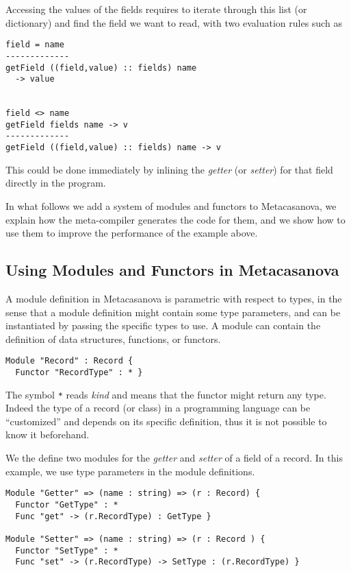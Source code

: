 Accessing the values of the fields requires to iterate through this list (or dictionary) and find the field we want to read, with two evaluation rules such as

\begin{lstlisting}
field = name
-------------
getField ((field,value) :: fields) name 
  -> value


field <> name
getField fields name -> v
-------------
getField ((field,value) :: fields) name -> v
\end{lstlisting}

\noindent
This could be done immediately by inlining the \textit{getter} (or \textit{setter}) for that field directly in the program.

In what follows we add a system of modules and functors to Metacasanova, we explain how the meta-compiler generates the code for them, and we show how to use them to improve the performance of the example above.

\subsection{Using Modules and Functors in Metacasanova}
\label{subsec:record_implementation}
A module definition in Metacasanova is parametric with respect to types, in the sense that a module definition might contain some type parameters, and can be instantiated by passing the specific types to use. A module can contain the definition of data structures, functions, or functors.

\begin{lstlisting}
Module "Record" : Record {
  Functor "RecordType" : * }
\end{lstlisting}

The symbol \texttt{*} reads \textit{kind} and means that the functor might return any type. Indeed the type of a record (or class) in a programming language can be ``customized'' and depends on its specific definition, thus it is not possible to know it beforehand.

We the define two modules for the \textit{getter} and \textit{setter} of a field of a record. In this example, we use type parameters in the module definitions.

\begin{lstlisting}
Module "Getter" => (name : string) => (r : Record) {
  Functor "GetType" : *
  Func "get" -> (r.RecordType) : GetType }
  
Module "Setter" => (name : string) => (r : Record ) {
  Functor "SetType" : *
  Func "set" -> (r.RecordType) -> SetType : (r.RecordType) }
\end{lstlisting}

